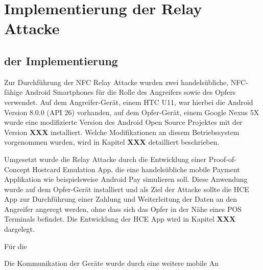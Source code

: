 \makeatletter\ifthesis@masterthesis
\chapter{Implementierung der Relay Attacke}
\label{sec:implementation}

\section{ der Implementierung}

Zur Durchführung der NFC Relay Attacke wurden zwei handelsübliche, NFC-fähige Android Smartphones für die Rolle des Angreifers sowie des Opfers verwendet. Auf dem Angreifer-Gerät, einem HTC U11, war hierbei die Android Version 8.0.0 (API 26) vorhanden, auf dem Opfer-Gerät, einem Google Nexus 5X wurde eine modifizierte Version des Android Open Source Projektes mit der Version \textbf{XXX} installiert. Welche Modifikationen an diesem Betriebssystem vorgenommen wurden, wird in Kapitel \textbf{XXX} detailliert beschrieben.

Umgesetzt wurde die Relay Attacke durch die Entwicklung einer Proof-of-Concept Hostcard Emulation App, die eine handelsübliche mobile Payment Applikation wie beispielsweise Android Pay simulieren soll. Diese Anwendung wurde auf dem Opfer-Gerät installiert und als Ziel der Attacke sollte die HCE App zur Durchführung einer Zahlung und Weiterleitung der Daten an den Angreifer angeregt werden, ohne dass sich das Opfer in der Nähe eines POS Terminals befindet. Die Entwicklung der HCE App wird in Kapitel \textbf{XXX} dargelegt. 

Für die 

Die Kommunikation der Geräte wurde durch eine weitere mobile An
\fi\makeatother